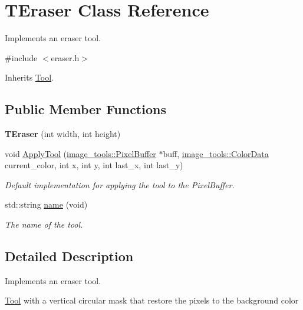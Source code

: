 \hypertarget{classTEraser}{}\section{T\+Eraser Class Reference}
\label{classTEraser}


Implements an eraser tool.  




{\ttfamily \#include $<$eraser.\+h$>$}



Inherits \hyperlink{classTool}{Tool}.

\subsection*{Public Member Functions}
\begin{DoxyCompactItemize}
\item 
{\bfseries T\+Eraser} (int width, int height)\hypertarget{classTEraser_a8ec6f2b3993f9f3b440578dbf12b9b0f}{}\label{classTEraser_a8ec6f2b3993f9f3b440578dbf12b9b0f}

\item 
void \hyperlink{classTEraser_af3c3f1cf42dcf566673388c8c5492d13}{Apply\+Tool} (\hyperlink{classimage__tools_1_1PixelBuffer}{image\+\_\+tools\+::\+Pixel\+Buffer} $\ast$buff, \hyperlink{classimage__tools_1_1ColorData}{image\+\_\+tools\+::\+Color\+Data} current\+\_\+color, int x, int y, int last\+\_\+x, int last\+\_\+y)
\begin{DoxyCompactList}\small\item\em Default implementation for applying the tool to the Pixel\+Buffer. \end{DoxyCompactList}\item 
std\+::string \hyperlink{classTEraser_a7d1739530674f8f7b82485dd4337ecc5}{name} (void)
\begin{DoxyCompactList}\small\item\em The name of the tool. \end{DoxyCompactList}\end{DoxyCompactItemize}


\subsection{Detailed Description}
Implements an eraser tool. 

\hyperlink{classTool}{Tool} with a vertical circular mask that restore the pixels to the background color 

